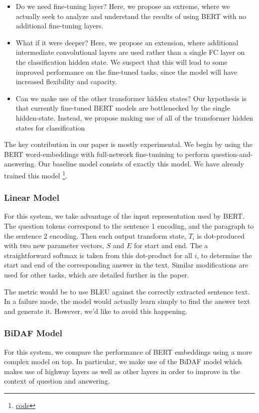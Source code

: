\documentclass{article}
\begin{document}
\begin{itemize}
    \item Do we need fine-tuning layer? Here, we propose an extreme, where we actually seek to analyze and understand the results of using BERT with no additional fine-tuning layers.
    \item What if it were deeper? Here, we propose an extension, where additional intermediate convolutional layers are used rather than a single FC layer on the classification hidden state. We suspect that this will lead to some improved performance on the fine-tuned tasks, since the model will have increased flexibility and capacity.
    \item Can we make use of the other transformer hidden states? Our hypothesis is that currently fine-tuned BERT models are bottlenecked by the single hidden-state. Instead, we propose making use of all of the transformer hidden states for classification
\end{itemize} 

The key contribution in our paper is mostly experimental. We begin by using the BERT word-embeddings with full-network fine-tunining to perform question-and-answering. Our baseline model consists of exactly this model. We have already trained this model \footnote{\href{https://github.com/kandluis/cs224n}{code}}.

\subsubsection{Linear Model}
For this system, we take advantage of the input representation used by BERT. The question tokens correspond to the sentence 1 encoding, and the paragraph to the sentence 2 encoding. Then each output transform state, $T_i$ is dot-produced with two new parameter vectors, $S$ and $E$ for start and end. The a straightforward softmax is taken from this dot-product for all $i$, to determine the start and end of the corresponding answer in the text. Similar modifications are used for other tasks, which are detailed further in the paper. 

The metric would be to use BLEU against the correctly extracted sentence text. In a failure mode, the model would actually learn simply to find the answer text and generate it. However, we'd like to avoid this happening. 

\subsubsection{BiDAF Model}
For this system, we compare the performance of BERT embeddings using a more complex model on top. In particular, we make use of the BiDAF model which makes use of highway layers as well as other layers in order to improve in the context of question and answering.
\end{document}
